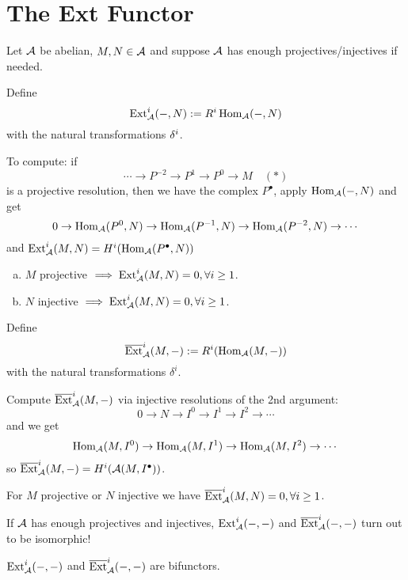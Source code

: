 \documentclass[a4paper]{report}
\begin{document}
\section{The Ext Functor}
Let $\mathcal{A}$ be abelian, $M, N \in \mathcal{A}$ and suppose $\mathcal{A}$ has enough projectives/injectives if needed.
\begin{defi}
  Define
  \[\operatorname{Ext}_{\mathcal{A}}^{i}(-, N) := R^{i}\operatorname{Hom}_{\mathcal{A}}(-,N)\] with the natural transformations $\delta^{i}$.
\end{defi}
\begin{exmp*}
  To compute: if \[\cdots \to P^{-2} \to P^{1} \to P^{0} \to M\quad (*)\] is a projective resolution, then we have the complex $P^{\bullet}$, apply $\operatorname{Hom}_{\mathcal{A}}(-,N)$ and get \[0 \to \operatorname{Hom}_{\mathcal{A}}(P^{0}, N) \to \operatorname{Hom}_{\mathcal{A}}(P^{-1}, N) \to \operatorname{Hom}_{\mathcal{A}}(P^{-2}, N) \to \cdots\]
  and $\operatorname{Ext}_{\mathcal{A}}^{i}(M,N) = H^{i}(\operatorname{Hom}_{\mathcal{A}}(P^{\bullet}, N))$
\end{exmp*}
\begin{prop}
\begin{enumerate}[(a)]
  \item $M$ projective $\implies \operatorname{Ext}_{\mathcal{A}}^{i}(M,N)= 0, \forall i \ge 1$.
        \item $N$ injective $\implies \operatorname{Ext}_{\mathcal{A}}^{i}(M,N) = 0, \forall i \ge 1$.
\end{enumerate}

\end{prop}

\begin{defi}
Define \[\overline {\operatorname{Ext}}_{\mathcal{A}}^{i}(M,-) := R^{i}(\operatorname{Hom}_{\mathcal{A}}(M,-))\]with the natural transformations $\delta^{i}$.
\end{defi}
\begin{exmp*}Compute $\overline {\operatorname{Ext}}_{\mathcal{A}}^{i}(M,-)$ via injective resolutions of the 2nd argument: \[0 \to N \to I^{0} \to I^{1} \to I^{2} \to \cdots\]and we get \[\operatorname{Hom}_{\mathcal{A}}(M,I^{0}) \to \operatorname{Hom}_{\mathcal{A}}(M,I^{1}) \to \operatorname{Hom}_{\mathcal{A}}(M,I^{2}) \to \cdots\]
  so $\overline {\operatorname{Ext}}_{\mathcal{A}}^{i}(M,-) = H^{i}(\mathcal{A}(M,I^{\bullet}))$.
\end{exmp*}


\begin{prop}
  For $M$ projective or $N$ injective we have $\overline {\operatorname{Ext}}_{\mathcal{A}}^{i}(M,N) = 0, \forall i \ge 1$.
\end{prop}
\begin{rem*}
If $\mathcal{A}$ has enough projectives and injectives, $\operatorname{Ext}_{\mathcal{A}}^{i}(-,-)$ and $\overline {\operatorname{Ext}}_{\mathcal{A}}^{i}(-,-)$ turn out to be isomorphic!
\end{rem*}
\begin{rem*}
  $\operatorname{Ext}_{\mathcal{A}}^{i}(-,-)$ and $\overline {\operatorname{Ext}}_{\mathcal{A}}^{i}(-,-)$ are bifunctors.
\end{rem*}
\end{document}
